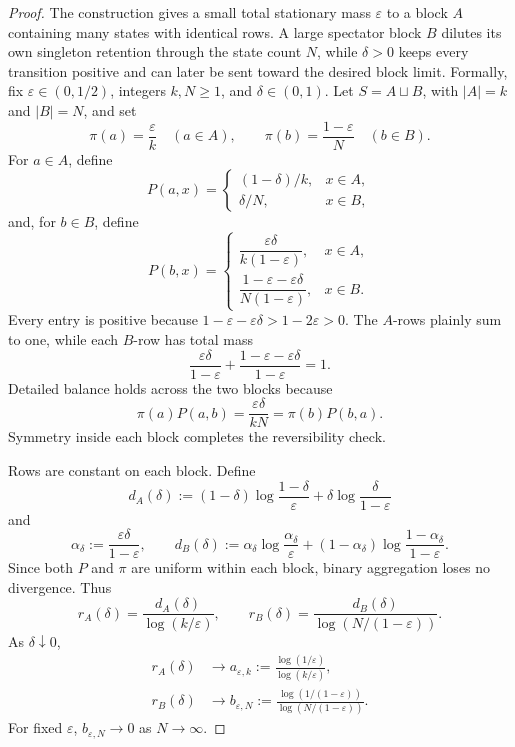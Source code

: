 \documentclass[11pt]{article}
\begin{document}
\begin{proof}
The construction gives a small total stationary mass \(\varepsilon\) to a
block \(A\) containing many states with identical rows.  A large spectator
block \(B\) dilutes its own singleton retention through the state count
\(N\), while \(\delta>0\) keeps every transition positive and can later be
sent toward the desired block limit.  Formally, fix
\(\varepsilon\in(0,1/2)\), integers \(k,N\ge1\), and
\(\delta\in(0,1)\).  Let \(S=A\sqcup B\), with \(|A|=k\) and
\(|B|=N\), and set
\[
  \pi(a)=\frac{\varepsilon}{k}\quad(a\in A),
  \qquad
  \pi(b)=\frac{1-\varepsilon}{N}\quad(b\in B).
\]
For \(a\in A\), define
\[
  P(a,x)=
  \begin{cases}
    (1-\delta)/k,&x\in A,\\
    \delta/N,&x\in B,
  \end{cases}
\]
and, for \(b\in B\), define
\[
  P(b,x)=
  \begin{cases}
    \dfrac{\varepsilon\delta}{k(1-\varepsilon)},&x\in A,\\[6pt]
    \dfrac{1-\varepsilon-\varepsilon\delta}{N(1-\varepsilon)},&x\in B.
  \end{cases}
\]
Every entry is positive because
\(1-\varepsilon-\varepsilon\delta>1-2\varepsilon>0\).  The \(A\)-rows
plainly sum to one, while each \(B\)-row has total mass
\[
  \frac{\varepsilon\delta}{1-\varepsilon}
  +\frac{1-\varepsilon-\varepsilon\delta}{1-\varepsilon}
  =1.
\]
Detailed balance holds
across the two blocks because
\[
  \pi(a)P(a,b)
  =\frac{\varepsilon\delta}{kN}
  =\pi(b)P(b,a).
\]
Symmetry inside each block completes the reversibility check.

Rows are constant on each block.  Define
\[
  d_A(\delta)
  :=
  (1-\delta)\log\frac{1-\delta}{\varepsilon}
  +\delta\log\frac{\delta}{1-\varepsilon}
\]
and
\[
  \alpha_\delta:=\frac{\varepsilon\delta}{1-\varepsilon},
  \qquad
  d_B(\delta)
  :=
  \alpha_\delta\log\frac{\alpha_\delta}{\varepsilon}
  +(1-\alpha_\delta)
    \log\frac{1-\alpha_\delta}{1-\varepsilon}.
\]
Since both \(P\) and \(\pi\) are uniform within each block, binary
aggregation loses no divergence.  Thus
\[
  r_A(\delta)=\frac{d_A(\delta)}{\log(k/\varepsilon)},
  \qquad
  r_B(\delta)=\frac{d_B(\delta)}{\log(N/(1-\varepsilon))}.
\]
As \(\delta\downarrow0\),
\begin{align*}
  r_A(\delta)&\longrightarrow
  a_{\varepsilon,k}
  :=\frac{\log(1/\varepsilon)}{\log(k/\varepsilon)},\\
  r_B(\delta)&\longrightarrow
  b_{\varepsilon,N}
  :=\frac{\log(1/(1-\varepsilon))}
          {\log(N/(1-\varepsilon))}.
\end{align*}
For fixed \(\varepsilon\), \(b_{\varepsilon,N}\to0\) as \(N\to\infty\).


\end{proof}
\end{document}
